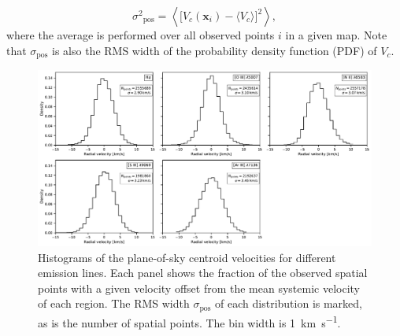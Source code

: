 \documentclass[fleqn,usenatbib, useAMS, a4paper]{mnras}
\newcommand\pos{\ensuremath{_{\mathrm{pos}}}}
\newcommand\xx{\ensuremath{\boldsymbol{x}}}
\begin{document}
\begin{equation}
  \label{eq:sig-pos}
  \sigma^2\pos =
  \left\langle 
  \bigl[ V_c (\xx_i) -\langle V_ c\rangle  \bigr]^2
  \right \rangle ,
\end{equation}
where the average is performed over all observed points \(i\)
in a given map.
Note that \(\sigma\pos\) is also the RMS width of
the probability density function (PDF) of \(V_c\).

\begin{figure}
 \centering
 \includegraphics[width=5in]{figures/pdfs}\par
 \caption{
   Histograms of the plane-of-sky centroid velocities for different emission lines.
   Each panel shows the fraction of the observed spatial points
   with a given velocity offset from the mean systemic velocity of each region.
   The RMS width \(\sigma\pos\) of each distribution is marked,
   as is the number of spatial points.
   The bin width is \SI{1}{km.s^{-1}}.
 }
\label{fig:pdfs}
\end{figure}
\end{document}
